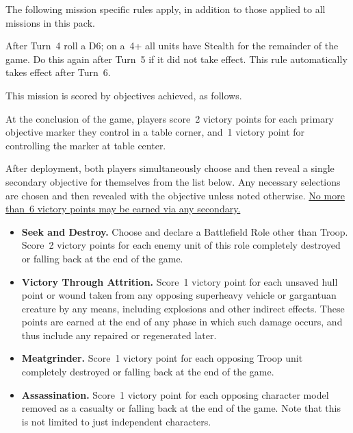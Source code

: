 The following mission specific rules apply, in addition to those
applied to all missions in this pack.

  After Turn~4 roll a D6; on a~4+
all units have Stealth for the remainder of the game.  Do this again
after Turn~5 if it did not take effect.  This rule automatically takes
effect after Turn~6.



This mission is scored by objectives achieved, as follows.

 At the conclusion of the game,
players score~2 victory points for each primary objective marker they
control in a table corner, and~1 victory point for controlling the
marker at table center.




After deployment, both players simultaneously choose and then reveal a
single secondary objective for themselves from the list below.  Any
necessary selections are chosen and then revealed with the objective
unless noted otherwise.  \underline{No more than~6 victory points may
  be earned via any secondary.}

\begin{itemize}
\item \textbf{Seek and Destroy.}  Choose and declare a Battlefield
  Role other than Troop.  Score~2 victory points for each enemy unit
  of this role completely destroyed or falling back at the end of the
  game.

\item \textbf{Victory Through Attrition.}  Score~1 victory point for
  each unsaved hull point or wound taken from any opposing superheavy
  vehicle or gargantuan creature by any means, including explosions
  and other indirect effects.  These points are earned at the end of
  any phase in which such damage occurs, and thus include any repaired
  or regenerated later.

\item \textbf{Meatgrinder.}  Score~1 victory point for each opposing
  Troop unit completely destroyed or falling back at the end of the
  game.

\item \textbf{Assassination.}  Score~1 victory point for each opposing
  character model removed as a casualty or falling back at the end of
  the game.  Note that this is not limited to just independent
  characters.

\end{itemize}


